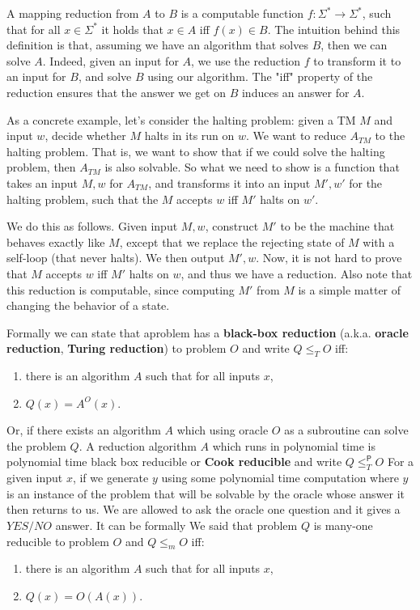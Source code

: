 A mapping reduction from $A$ to $B$ is a computable function $f:\Sigma^*\to \Sigma^*$, such that for all $x\in \Sigma^*$ it holds that $x\in A$ iff $f(x)\in B$. The intuition behind this definition is that, assuming we have an algorithm that solves $B$, then we can solve $A$. Indeed, given an input for $A$, we use the reduction $f$ to transform it to an input for $B$, and solve $B$ using our algorithm. The "iff" property of the reduction ensures that the answer we get on $B$ induces an answer for $A$.

As a concrete example, let's consider the halting problem: given a TM $M$ and input $w$, decide whether $M$ halts in its run on $w$.
We want to reduce $A_{TM}$ to the halting problem. That is, we want to show that if we could solve the halting problem, then $A_{TM}$ is also solvable. So what we need to show is a function that takes an input $M,w$ for $A_{TM}$, and transforms it into an input $M',w'$ for the halting problem, such that the $M$ accepts $w$ iff $M'$ halts on $w'$.

We do this as follows. Given input $M,w$, construct $M'$ to be the machine that behaves exactly like $M$, except that we replace the rejecting state of $M$ with a self-loop (that never halts). We then output $M',w$. Now, it is not hard to prove that $M$ accepts $w$ iff $M'$ halts on $w$, and thus we have a reduction. Also note that this reduction is computable, since computing $M'$ from $M$ is a simple matter of changing the behavior of a state.

Formally we can state that aproblem has a \textbf{black-box reduction} (a.k.a. \textbf{oracle reduction}, \textbf{Turing reduction}) to problem $O$ and write $Q \leq_T O$ iff:
\begin{enumerate}
    \item there is an algorithm $A$ such that for all inputs $x$,
    \item $Q(x) = A^O(x)$.
\end{enumerate}

Or, if there exists an algorithm $A$ which using oracle $O$ as a subroutine can solve the problem $Q$. A reduction algorithm $A$ which runs in polynomial time is polynomial time black box reducible or \textbf{Cook reducible} and 
write $Q\leq^\mathsf{P}_T O$ For a given input $x$,  if we generate $y$ using some polynomial time computation where $y$ is an instance of the problem that will be solvable by the oracle whose answer it then returns to us. We are allowed to ask the oracle one question and it gives a $YES/NO$ answer. It can be formally We said that problem $Q$ is many-one reducible to problem $O$ and $Q \leq_m O$ iff:
\begin{enumerate}
    \item there is an algorithm $A$ such that for all inputs $x$,  
    \item $Q(x) = O(A(x))$.
\end{enumerate}